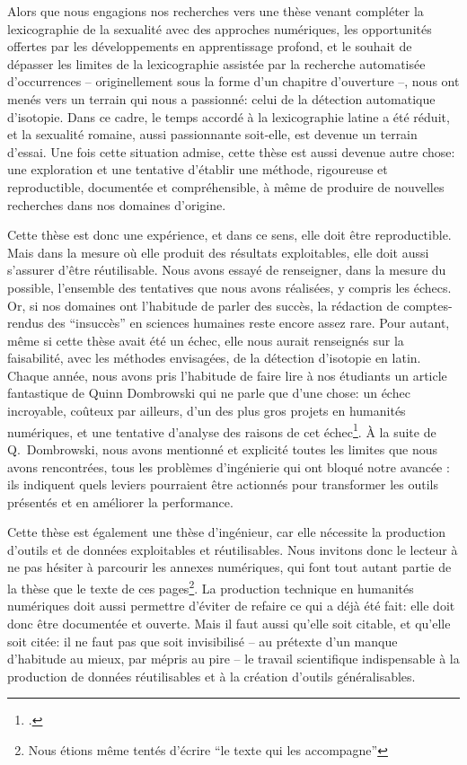Alors que nous engagions nos recherches vers une thèse venant compléter la lexicographie de la sexualité avec des approches numériques, les opportunités offertes par les développements en apprentissage profond, et le souhait de dépasser les limites de la lexicographie assistée par la recherche automatisée d'occurrences -- originellement sous la forme d'un chapitre d'ouverture --, nous ont menés vers un terrain qui nous a passionné: celui de la détection automatique d'isotopie. Dans ce cadre, le temps accordé à la lexicographie latine a été réduit, et la sexualité romaine, aussi passionnante soit-elle, est devenue un terrain d'essai. Une fois cette situation admise, cette thèse est aussi devenue autre chose:
une exploration et une tentative d'établir une méthode, rigoureuse et reproductible, documentée et compréhensible, à même de produire de nouvelles recherches dans nos domaines d'origine.

Cette thèse est donc une expérience, et dans ce sens, elle doit être reproductible. Mais dans la mesure où elle produit des résultats exploitables, elle doit aussi s'assurer d'être réutilisable. Nous avons essayé de renseigner, dans la mesure du possible, l'ensemble des tentatives que nous avons réalisées, y compris les échecs. Or, si nos domaines ont l'habitude de parler des succès, la rédaction de comptes-rendus des \enquote{insuccès} en sciences humaines reste encore assez rare. Pour autant, même si cette thèse avait été un échec, elle nous aurait renseignés sur la faisabilité, avec les méthodes envisagées, de la détection d'isotopie en latin. Chaque année, nous avons pris l'habitude de faire lire à nos étudiants un article fantastique de Quinn Dombrowski qui ne parle que d'une chose: un échec incroyable, coûteux par ailleurs, d'un des plus gros projets en humanités numériques, et une tentative d'analyse des raisons de cet échec\footcite{dombrowski2014ever}. À la suite de Q.~Dombrowski, nous avons mentionné et explicité toutes les limites que nous avons rencontrées, tous les problèmes d'ingénierie qui ont bloqué notre avancée : ils indiquent quels leviers pourraient être actionnés pour transformer les outils présentés et en améliorer la performance.

Cette thèse est également une thèse d'ingénieur, car elle nécessite la production d'outils et de données exploitables et réutilisables. Nous invitons donc le lecteur à ne pas hésiter à parcourir les annexes numériques, qui font tout autant partie de la thèse que le texte de ces pages\footnote{Nous étions même tentés d'écrire \enquote{le texte qui les accompagne}}. La production technique en humanités numériques doit aussi permettre d'éviter de refaire ce qui a déjà été fait: elle doit donc être documentée et ouverte. Mais il faut aussi qu'elle soit citable, et qu'elle soit citée: il ne faut pas que soit invisibilisé -- au prétexte d'un manque d'habitude au mieux, par mépris au pire -- le travail scientifique indispensable à la production de données réutilisables et à la création d'outils généralisables.

